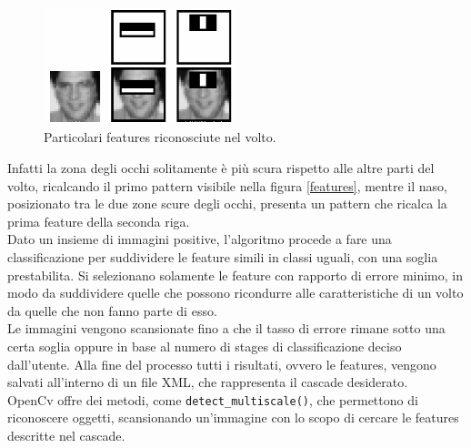 \begin{itemize}
\begin{figure}%
\centering
\includegraphics[width=0.5\textwidth]{images/openCv/haar.png}
\caption{Particolari features riconosciute nel volto.\label{volti}}
\end{figure}

Infatti la zona degli occhi solitamente è più scura rispetto alle altre parti del volto, ricalcando il primo pattern visibile nella figura \ref{features}, mentre il naso, posizionato tra le due zone scure degli occhi, presenta un pattern che ricalca la prima feature della seconda riga.\\
Dato un insieme di immagini positive, l'algoritmo procede a fare una classificazione per suddividere le feature simili in classi uguali, con una soglia prestabilita. Si selezionano solamente le feature con rapporto di errore minimo, in modo da suddividere quelle che possono ricondurre alle caratteristiche di un volto da quelle che non fanno parte di esso.\\
Le immagini vengono scansionate fino a che il tasso di errore rimane sotto una certa soglia oppure in base al numero di stages di classificazione deciso dall'utente. Alla fine del processo tutti i risultati, ovvero le features, vengono salvati all'interno di un file XML, che rappresenta il cascade desiderato.\\
OpenCv offre dei metodi, come \texttt{detect\_multiscale()}, che permettono di riconoscere oggetti, scansionando un'immagine con lo scopo di cercare le features descritte nel cascade. 


\end{itemize}

